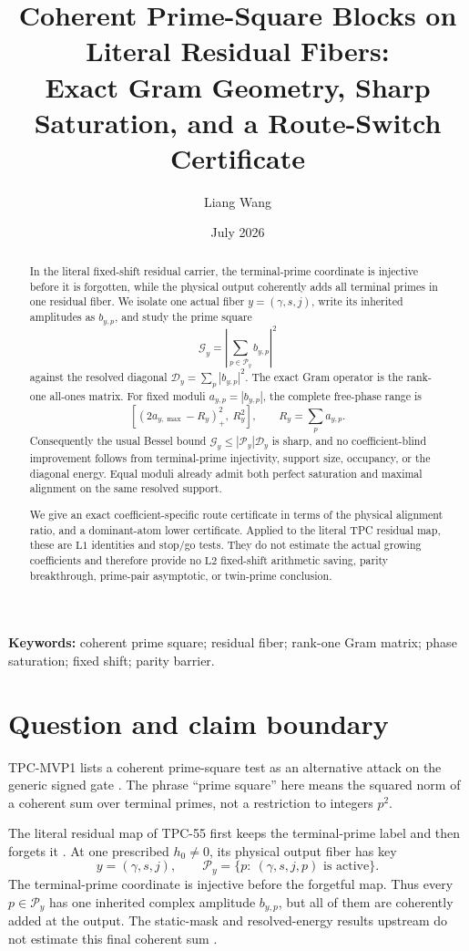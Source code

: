 \documentclass[11pt,a4paper]{article}
\title{\bfseries Coherent Prime-Square Blocks on Literal Residual Fibers:\\
Exact Gram Geometry, Sharp Saturation, and a Route-Switch Certificate}
\author{Liang Wang}
\date{July 2026}
\theoremstyle{definition}
\theoremstyle{remark}
\newcommand{\Lone}{\mathrm{L1}}
\newcommand{\Ltwo}{\mathrm{L2}}
\newcommand{\cP}{\mathcal P}
\newcommand{\cD}{\mathcal D}
\newcommand{\cG}{\mathcal G}
\begin{document}
\maketitle

\begin{abstract}
In the literal fixed-shift residual carrier, the terminal-prime
coordinate is injective before it is forgotten, while the physical
output coherently adds all terminal primes in one residual fiber.
We isolate one actual fiber \(y=(\gamma,s,j)\), write its inherited
amplitudes as \(b_{y,p}\), and study the prime square
\[
  \cG_y=\left|\sum_{p\in\cP_y}b_{y,p}\right|^2
\]
against the resolved diagonal
\(\cD_y=\sum_p|b_{y,p}|^2\).
The exact Gram operator is the rank-one all-ones matrix.  For fixed
moduli \(a_{y,p}=|b_{y,p}|\), the complete free-phase range is
\[
 \left[(2a_{y,\max}-R_y)_+^2,\ R_y^2\right],
 \qquad R_y=\sum_pa_{y,p}.
\]
Consequently the usual Bessel bound
\(\cG_y\le|\cP_y|\cD_y\) is sharp, and no coefficient-blind
improvement follows from terminal-prime injectivity, support size,
occupancy, or the diagonal energy.  Equal moduli already admit both
perfect saturation and maximal alignment on the same resolved
support.

We give an exact coefficient-specific route certificate in terms of
the physical alignment ratio, and a dominant-atom lower certificate.
Applied to the literal TPC residual map, these are \(\Lone\)
identities and stop/go tests.  They do not estimate the actual
growing coefficients and therefore provide no \(\Ltwo\) fixed-shift
arithmetic saving, parity breakthrough, prime-pair asymptotic, or
twin-prime conclusion.
\end{abstract}

\medskip
\noindent\textbf{Keywords:} coherent prime square; residual fiber;
rank-one Gram matrix; phase saturation; fixed shift; parity barrier.

\section{Question and claim boundary}

TPC-MVP1 lists a coherent prime-square test as an alternative attack
on the generic signed gate \citep{WangMVP1}.  The phrase
``prime square'' here means the squared norm of a coherent sum over
terminal primes, not a restriction to integers \(p^2\).

The literal residual map of TPC-55 first keeps the terminal-prime
label and then forgets it \citep{WangTPC55}.  At one prescribed
\(h_0\ne0\), its physical output fiber has key
\[
 y=(\gamma,s,j),\qquad
 \cP_y=\{p:\ (\gamma,s,j,p)\text{ is active}\}.
\]
The terminal-prime coordinate is injective before the forgetful map.
Thus every \(p\in\cP_y\) has one inherited complex amplitude
\(b_{y,p}\), but all of them are coherently added at the output.
The static-mask and resolved-energy results upstream do not estimate
this final coherent sum \citep{WangTPC50,WangTPC55}.
\end{document}
